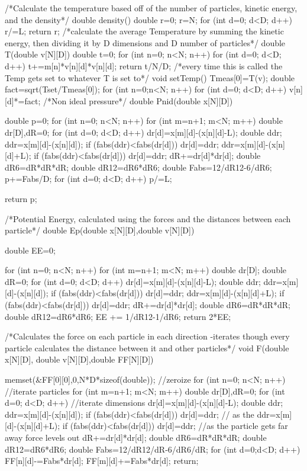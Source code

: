 /*Calculate the temperature based off of the number of particles, kinetic energy, and the density*/
double density(){
  double r=0;
  r=N;
  for (int d=0; d<D; d++) r/=L;
  return r;
}
/*calculate the average Temperature by summing the kinetic energy, then dividing it by D dimensions and D number of particles*/
double T(double v[N][D]){
  double t=0;
  for (int n=0; n<N; n++)
    for (int d=0; d<D; d++)
      t+=m[n]*v[n][d]*v[n][d];
  return t/N/D;
}
/*every time this is called the Temp gets set to whatever T is set to*/
void setTemp(){
  Tmeas[0]=T(v);
  double fact=sqrt(Tset/Tmeas[0]);
  for (int n=0;n<N; n++)
    for (int d=0; d<D; d++)
      v[n][d]*=fact;
}
/*Non ideal pressure*/
double Pnid(double x[N][D]){
  double p=0;
  for (int n=0; n<N; n++)
    for (int m=n+1; m<N; m++){
      double dr[D],dR=0;
      for (int d=0; d<D; d++){
	dr[d]=x[m][d]-(x[n][d]-L);
	double ddr;
	ddr=x[m][d]-(x[n][d]);
	if (fabs(ddr)<fabs(dr[d])) dr[d]=ddr;
	ddr=x[m][d]-(x[n][d]+L);
	if (fabs(ddr)<fabs(dr[d])) dr[d]=ddr;
	dR+=dr[d]*dr[d];
      }
      double dR6=dR*dR*dR;
      double dR12=dR6*dR6;
      double Fabs=12/dR12-6/dR6;
      p+=Fabs/D;
    }
  for (int d=0; d<D; d++) p/=L; 

  return p;
}
/*Potential Energy, calculated using the forces and the distances between each particle*/
double Ep(double x[N][D],double v[N][D]){
  double EE=0;

  for (int n=0; n<N; n++)
    for (int m=n+1; m<N; m++){
      double dr[D];
      double dR=0;
      for (int d=0; d<D; d++){
	dr[d]=x[m][d]-(x[n][d]-L);
	double ddr;
	ddr=x[m][d]-(x[n][d]);
	if (fabs(ddr)<fabs(dr[d])) dr[d]=ddr;
	ddr=x[m][d]-(x[n][d]+L);
	if (fabs(ddr)<fabs(dr[d])) dr[d]=ddr;
	dR+=dr[d]*dr[d];
      }
      double dR6=dR*dR*dR;
      double dR12=dR6*dR6;
      EE += 1/dR12-1/dR6;
    }
  return 2*EE;
}
/*Calculates the force on each particle in each direction
-iterates though every particle calculates the distance between it and other particles*/
void F(double x[N][D], double v[N][D],double FF[N][D]){

  memset(&FF[0][0],0,N*D*sizeof(double)); //zeroize
  for (int n=0; n<N; n++) //iterate particles
    for (int m=n+1; m<N; m++){ 
      double dr[D],dR=0;
      for (int d=0; d<D; d++){ //iterate dimensions
	dr[d]=x[m][d]-(x[n][d]-L);
	double ddr;
	ddr=x[m][d]-(x[n][d]);
	if (fabs(ddr)<fabs(dr[d])) dr[d]=ddr; // as the 
	ddr=x[m][d]-(x[n][d]+L);
	if (fabs(ddr)<fabs(dr[d])) dr[d]=ddr; //as the particle gets far away force levels out
	dR+=dr[d]*dr[d];
      }
      double dR6=dR*dR*dR;
      double dR12=dR6*dR6;
      double Fabs=12/dR12/dR-6/dR6/dR;
      for (int d=0;d<D; d++){
	FF[n][d]-=Fabs*dr[d];
	FF[m][d]+=Fabs*dr[d];
      }
    }
  return;
}
